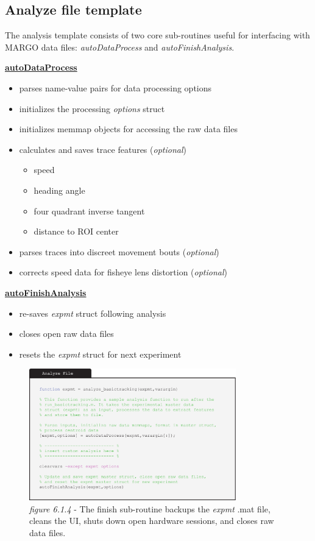 \documentclass[11pt]{article}
\begin{document}
\newpage
\subsection{Analyze file template}

The analysis template consists of two core sub-routines useful for interfacing with MARGO data files: \textit{autoDataProcess} and \textit{autoFinishAnalysis}.

\textbf{\underline{autoDataProcess}}
\begin{itemize}
	\itemsep0em
	\item parses name-value pairs for data processing options
	\item initializes the processing \textit{options} struct
	\item initializes memmap objects for accessing the raw data files
	\item calculates and saves trace features (\textit{optional})
	\begin{itemize}
		\itemsep0em
		\item speed
		\item heading angle
		\item four quadrant inverse tangent
		\item distance to ROI center
	\end{itemize}
	\item parses traces into discreet movement bouts (\textit{optional})
	\item corrects speed data for fisheye lens distortion (\textit{optional})
\end{itemize}
\textbf{\underline{autoFinishAnalysis}}
\begin{itemize}
	\itemsep0em
	\item re-saves \textit{expmt} struct following analysis
	\item closes open raw data files
	\item resets the \textit{expmt} struct for next experiment
\end{itemize}

\begin{figure}[h!]
	\begin{center}
		\includegraphics[width=0.8\textwidth]{images/custom_exp/analysis.pdf}
		\caption*{\footnotesize {\textit{figure 6.1.4} - The finish sub-routine backups the \textit{expmt} .mat file, cleans the UI, shuts down open hardware sessions, and closes raw data files.}}
	\end{center}
\end{figure}
\end{document}
